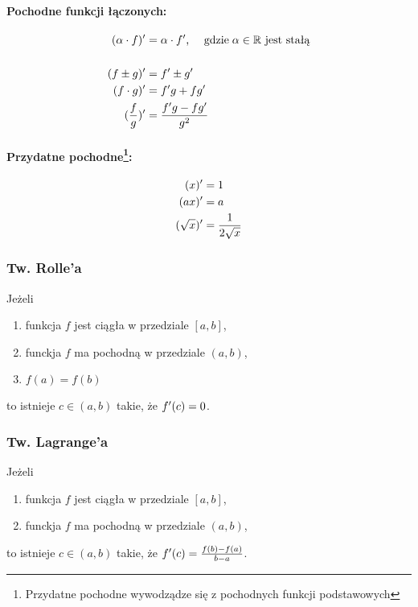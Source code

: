 \documentclass[../Matematyka.tex]{subfiles}
\begin{document}
    \paragraph{Pochodne funkcji łączonych:}
    \begin{align*}
        (\alpha \cdot f)^\prime &= \alpha \cdot f^\prime \text{, \quad gdzie} \; \alpha \in \mathbb{R} \text{ jest stałą} \\
        \\
        (f \pm g)^\prime &= f^\prime \pm g^\prime \\
        (f \cdot g)^\prime &= f^\prime g + f g^\prime \\
        (\frac{f}{g})^\prime &= \frac{f^\prime g - f g^\prime}{g^2}
    \end{align*}

    \paragraph[Przydatne pochodne:]
        {Przydatne pochodne\footnote{Przydatne pochodne wywodządze się z pochodnych funkcji podstawowych}:}
    \begin{align*}
        (x)^\prime &= 1 \\
        (ax)^\prime &= a \\
        (\sqrt{x})^\prime &= \frac{1}{2\sqrt{x}} \\
    \end{align*}

    \subsubsection{Tw. Rolle'a}
    Jeżeli
    \begin{enumerate}
        \item funkcja \(f\) jest ciągła w przedziale \([a, b]\),
        \item funckja \(f\) ma pochodną w przedziale \((a, b)\),
        \item \(f(a) = f(b)\)
    \end{enumerate}
    to istnieje \(c \in (a, b)\) takie, że \(f^\prime(c) = 0\).

    \subsubsection{Tw. Lagrange'a}
    Jeżeli 
    \begin{enumerate}
        \item funkcja \(f\) jest ciągła w przedziale \([a, b]\),
        \item funckja \(f\) ma pochodną w przedziale \((a, b)\),
    \end{enumerate}
    to istnieje \(c \in (a, b)\) takie, że \(f^\prime(c) = \frac{f(b) - f(a)}{b - a}\).
\end{document}
